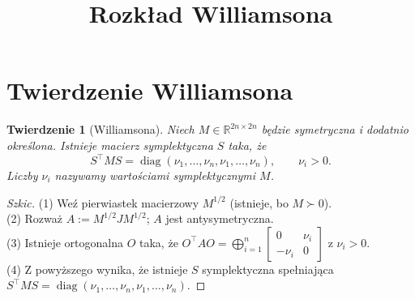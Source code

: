 \documentclass[12pt]{article}
\title{Rozkład Williamsona}
\author{}
\date{}
\newtheorem{theorem}{Twierdzenie}
\begin{document}
\maketitle

\section*{Twierdzenie Williamsona}

\begin{theorem}[Williamsona]
Niech $M\in\mathbb{R}^{2n\times 2n}$ będzie symetryczna i dodatnio określona.
Istnieje macierz symplektyczna $S$ taka, że
\[
S^\top M S=\operatorname{diag}(\nu_1,\dots,\nu_n,\nu_1,\dots,\nu_n),\qquad \nu_i>0.
\]
Liczby $\nu_i$ nazywamy wartościami symplektycznymi $M$.
\end{theorem}

\begin{proof}[Szkic]
(1) Weź pierwiastek macierzowy $M^{1/2}$ (istnieje, bo $M\succ0$).\\
(2) Rozważ $A:=M^{1/2} J M^{1/2}$; $A$ jest antysymetryczna.\\
(3) Istnieje ortogonalna $O$ taka, że 
$O^\top A O=\bigoplus_{i=1}^n \begin{bmatrix}0&\nu_i\\ -\nu_i&0\end{bmatrix}$ 
z $\nu_i>0$.\\
(4) Z powyższego wynika, że istnieje $S$ symplektyczna spełniająca $S^\top M S=\operatorname{diag}(\nu_1,\dots,\nu_n,\nu_1,\dots,\nu_n)$.
\end{proof}
\end{document}
